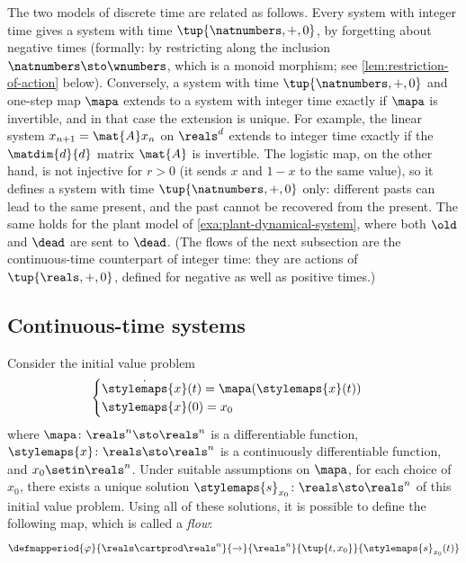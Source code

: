 The two models of discrete time are related as follows.
Every system with integer time gives a system with time $\tup{\natnumbers, +, 0}$, by forgetting about negative times (formally: by restricting along the inclusion $\natnumbers \sto \wnumbers$, which is a monoid morphism; see \cref{lem:restriction-of-action} below).
Conversely, a system with time $\tup{\natnumbers, +, 0}$ and one-step map $\mapa$ extends to a system with integer time exactly if $\mapa$ is invertible, and in that case the extension is unique.
For example, the linear system $x_{n+1} = \mat{A} x_n$ on $\reals^d$ extends to integer time exactly if the $\matdim{d}{d}$ matrix $\mat{A}$ is invertible.
The logistic map, on the other hand, is not injective for $r > 0$ (it sends $x$ and $1 - x$ to the same value), so it defines a system with time $\tup{\natnumbers, +, 0}$ only: different pasts can lead to the same present, and the past cannot be recovered from the present.
The same holds for the plant model of \cref{exa:plant-dynamical-system}, where both $\old$ and $\dead$ are sent to $\dead$.
(The flows of the next subsection are the continuous-time counterpart of integer time: they are actions of $\tup{\reals, +, 0}$, defined for negative as well as positive times.)

\subsection{Continuous-time systems}

Consider the initial value problem
\begin{equation}
    \begin{cases}
        \dot{\stylemaps{x}}(t) = \mapa(\stylemaps{x}(t)) \\
        \stylemaps{x}(0) = x_0
    \end{cases}
\end{equation}
where $\mapa \colon \reals^n \sto \reals^n$ is a differentiable function, $\stylemaps{x} \colon \reals \sto \reals^n$ is a continuously differentiable function, and $x_0 \setin \reals^n$.
Under suitable assumptions on $\mapa$, for each choice of $x_0$, there exists a unique solution $\stylemaps{s}_{x_0} \colon \reals \sto \reals^n$ of this initial value problem.
Using all of these solutions, it is possible to define the following map, which is called a \emph{flow}:
\begin{equation}
    \defmapperiod{
        \varphi
    }{
        \reals \cartprod \reals^n
    }{
        \to
    }{
        \reals^n
    }{
        \tup{t,x_0}
    }{
        \stylemaps{s}_{x_0}(t)
    }
\end{equation}

